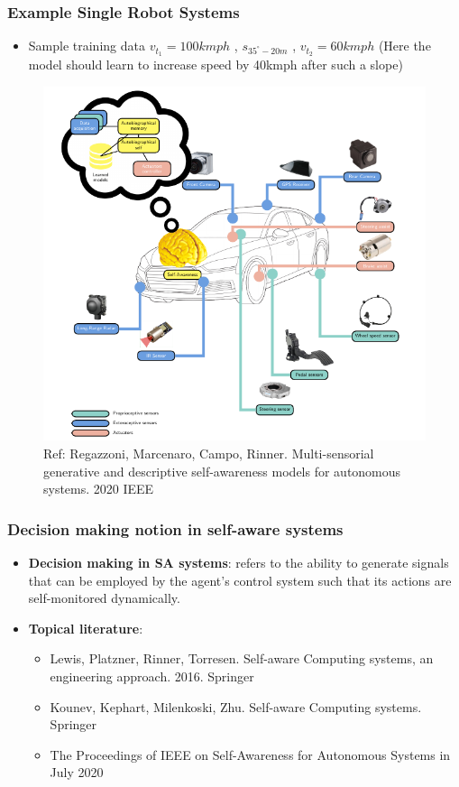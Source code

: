 \documentclass{beamer}
\begin{document}
	\begin{frame}
		\frametitle{Example Single Robot Systems}
		\begin{itemize}
				\item Sample training data $v_{t_1}=100kmph$ , $s_{35^{\circ}-20m}$ , $v_{t_2}=60kmph$ (Here the model should learn to increase speed by 40kmph after such a slope)
		\end{itemize}
		\begin{figure}
			\includegraphics[scale=0.3]{regazzoni-2020-multi-sensorial-generative-and-descriptive-self-awareness-models-for-autonomous-systems-fig-1.png}
			\caption{Ref: Regazzoni, Marcenaro, Campo, Rinner. Multi-sensorial generative and descriptive self-awareness models for autonomous systems. 2020 IEEE}
		\end{figure}		
	\end{frame}

	\begin{frame}
		\frametitle{Decision making notion in self-aware systems}
		\begin{itemize}
			\item \textbf{Decision making in SA systems}: refers to the ability to generate signals that can be employed by the agent’s control system such that its actions are self-monitored dynamically.
			\item \textbf{Topical literature}: 
				\begin{itemize}
					\item Lewis, Platzner, Rinner, Torresen. Self-aware Computing systems, an engineering approach. 2016. Springer
					\item Kounev, Kephart, Milenkoski, Zhu. Self-aware Computing systems. Springer
					\item The Proceedings of IEEE on Self-Awareness for Autonomous Systems in July 2020
				\end{itemize}
		\end{itemize}	
	\end{frame}
\end{document}
